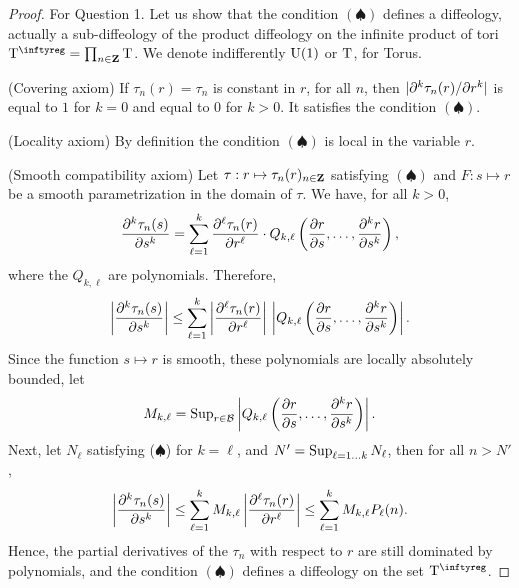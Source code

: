 \begin{proof}
  For Question 1. Let us show that the condition $(\spadesuit)$ defines a diffeology, actually a sub-diffeology of the
  product diffeology on the infinite product of tori $\Torus^\infty = \prod_{n\in \ZZ} \Torus$.
  We denote indifferently $\mathrm{U}(1)$ or $\mathrm{T}$,
  for Torus.
  
  {(Covering axiom)} If $\tau_n(r) = \tau_n$ is constant in $r$, for all $n$,
  then $\vert \partial^k \tau_n(r)/\partial r^k \vert$ is equal to $1$ for $k = 0$ and equal to $0$ for $k>0$.
  It satisfies the condition $(\spadesuit)$.
  
  {(Locality axiom)} By definition the condition $(\spadesuit)$ is local in the variable $r$.
  
  {(Smooth compatibility axiom)} Let $\tau : r \mapsto \tau_n(r)_{n\in \mathbf{Z}}$
  satisfying $(\spadesuit)$ and $F : s \mapsto r$
  be a smooth parametrization in the domain of $\tau$.
  We have, for all $k>0$,
  $$
    {\partial^k \tau_n(s) \over \partial s^k} = \sum_{\ell = 1}^{k}
    {\partial^\ell \tau_n(r) \over \partial r^\ell} \cdot
    Q_{k,\ell}\left({\partial r \over \partial s},\ldots,{\partial^k r \over \partial s^k}\right),
    $$
  where the $Q_{k,\ell}$ are polynomials. Therefore,
  $$
    \left|{\partial^k \tau_n(s) \over \partial s^k}\right| \leq \sum_{\ell = 1}^{k}
    \left|{\partial^\ell \tau_n(r) \over \partial r^\ell}\right| \,
    \left| \vphantom{{\partial^\ell \tau_n(r) \over \partial r^\ell}} Q_{k,\ell}\left({\partial r \over \partial s},\ldots,{\partial^k r \over \partial s^k}\right)\right|.
    $$
  Since the function $s\mapsto r$ is smooth, these polynomials are locally absolutely bounded, let
  $$
    M_{k,\ell} = \operatorname{Sup}_{r \in \mathcal{B}}
    \left|Q_{k,\ell}\left({\partial r \over \partial s},\ldots,{\partial^k r \over \partial s^k}\right)\right|.
    $$
  Next, let $N_\ell$ satisfying ($\spadesuit$) for $k=\ell$, and $N' = \operatorname{Sup}_{\ell = 1\ldots k} N_\ell$, then
  for all $n>N'$,
  $$
    \left|{\partial^k \tau_n(s) \over \partial s^k}\right| \leq \sum_{\ell = 1}^{k}
    M_{k,\ell}\left|{\partial^\ell \tau_n(r) \over \partial r^\ell}\right| \leq \sum_{\ell = 1}^{k}
    M_{k,\ell}P_\ell(n).
    $$
  Hence, the partial derivatives of the $\tau_n$ with respect to $r$ are still dominated by polynomials, and
  the condition $(\spadesuit)$ defines a diffeology on the set $\Torus^\infty$.
  

\end{proof}
